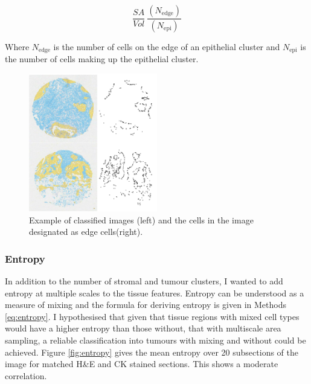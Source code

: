 \[\frac{SA}{Vol} ~ \frac{(N_{\mathrm{edge}})} {(N_{\mathrm{epi}})}\]

Where $N_{\mathrm{edge}}$ is the number of cells on the edge of an epithelial cluster and $N_{\mathrm{epi}}$ is the number of cells making up the epithelial cluster.

\begin{figure}
    \centering
    \includegraphics[width=0.5\textwidth]{Chapter3/Figs/Thesis-08.png}
    \caption{Example of classified images (left) and the cells in the image designated as edge cells(right).}
    \label{fig:edge_cells}
\end{figure}

\subsubsection*{Entropy}
In addition to the number of stromal and tumour clusters, I wanted to add entropy at multiple scales to the tissue features. Entropy can be understood as a measure of mixing and the formula for deriving entropy is given in Methods \ref{eq:entropy}. I hypothesised that given that tissue regions with mixed cell types would have a higher entropy than those without, that with multiscale area sampling, a reliable classification into tumours with mixing and without could be achieved. Figure \ref{fig:entropy} gives the mean entropy over 20 subsections of the image for matched H\&E and CK stained sections. This shows a moderate correlation. 


